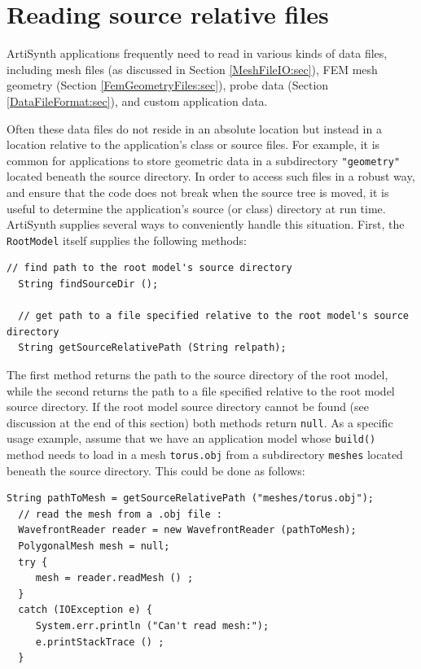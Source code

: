 \section{Reading source relative files}
\label{PathFinder:sec}

ArtiSynth applications frequently need to read in various kinds of
data files, including mesh files (as discussed in Section
\ref{MeshFileIO:sec}), FEM mesh geometry (Section
\ref{FemGeometryFiles:sec}), probe data (Section
\ref{DataFileFormat:sec}), and custom application data.

Often these data files do not reside in an absolute location but
instead in a location relative to the application's class or source
files.  For example, it is common for applications to store geometric
data in a subdirectory {\tt "geometry"} located beneath the source
directory. In order to access such files in a robust way, and ensure
that the code does not break when the source tree is moved, it is
useful to determine the application's source (or class) directory at
run time. ArtiSynth supplies several ways to conveniently handle this
situation. First, the {\tt RootModel} itself supplies the following
methods:
\begin{lstlisting}[]
  // find path to the root model's source directory
  String findSourceDir ();

  // get path to a file specified relative to the root model's source directory
  String getSourceRelativePath (String relpath);
\end{lstlisting}
%
The first method returns the path to the source directory of the
root model, while the second returns the path to a file specified
relative to the root model source directory. If the root model source
directory cannot be found (see discussion at the end of this section)
both methods return {\tt null}.
%
As a specific usage example, assume that we have an application model
whose {\tt build()} method needs to load in a mesh {\tt torus.obj}
from a subdirectory {\tt meshes} located beneath the source
directory. This could be done as follows:
%
\begin{lstlisting}[]
  String pathToMesh = getSourceRelativePath ("meshes/torus.obj");
  // read the mesh from a .obj file :
  WavefrontReader reader = new WavefrontReader (pathToMesh);
  PolygonalMesh mesh = null;
  try {
     mesh = reader.readMesh () ;
  }
  catch (IOException e) {
     System.err.println ("Can't read mesh:");
     e.printStackTrace () ;
  }
\end{lstlisting}

